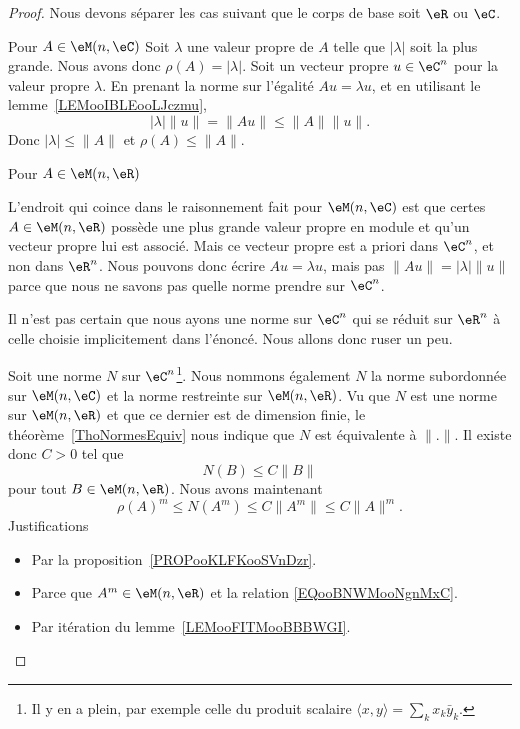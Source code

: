 \begin{proof}
    Nous devons séparer les cas suivant que le corps de base soit \( \eR\) ou \( \eC\).

    \begin{subproof}
        \item[Pour \( A\in \eM(n,\eC)\)]
            Soit \( \lambda\) une valeur propre de \( A\) telle que \( | \lambda |\) soit la plus grande. Nous avons donc \( \rho(A)=| \lambda |\). Soit un vecteur propre \( u\in \eC^n\) pour la valeur propre \( \lambda\). En prenant la norme sur l'égalité \( Au=\lambda u\), et en utilisant le lemme~\ref{LEMooIBLEooLJczmu},
            \begin{equation}
                | \lambda |\| u \|=\| Au \|\leq \| A \|\| u \|.
            \end{equation}
            Donc \( | \lambda |\leq \| A \|\) et \( \rho(A)\leq\| A \|\).

        \item[Pour \( A\in \eM(n,\eR)\)]

            L'endroit qui coince dans le raisonnement fait pour \( \eM(n,\eC)\) est que certes \( A\in \eM(n,\eR)\) possède une plus grande valeur propre en module et qu'un vecteur propre lui est associé. Mais ce vecteur propre est a priori dans \( \eC^n\), et non dans \( \eR^n\). Nous pouvons donc écrire \( Au=\lambda u\), mais pas \( \| Au \|=| \lambda |\| u \|\) parce que nous ne savons pas quelle norme prendre sur \( \eC^n\).

            Il n'est pas certain que nous ayons une norme sur \( \eC^n\) qui se réduit sur \( \eR^n\) à celle choisie implicitement dans l'énoncé. Nous allons donc ruser un peu.

            Soit une norme \( N\) sur \( \eC^n\)\footnote{Il y en a plein, par exemple celle du produit scalaire \( \langle x, y\rangle =\sum_kx_k\bar y_k\).}. Nous nommons également \( N\) la norme subordonnée sur \( \eM(n,\eC)\) et la norme restreinte sur \( \eM(n,\eR)\). Vu que \( N\) est une norme sur \( \eM(n,\eR)\) et que ce dernier est de dimension finie, le théorème~\ref{ThoNormesEquiv} nous indique que \( N\) est équivalente à \( \| . \|\). Il existe donc \( C>0\) tel que
            \begin{equation}        \label{EQooBNWMooNgnMxC}
                 N(B)\leq C\| B \|
            \end{equation}
            pour tout \( B\in \eM(n,\eR)\). Nous avons maintenant
            \begin{equation}
                \rho(A)^m\leq N(A^m)\leq C\| A^m \|\leq C\| A \|^m.
            \end{equation}
            Justifications
            \begin{itemize}
                \item Par la proposition~\ref{PROPooKLFKooSVnDzr}.
                \item Parce que \( A^m\in \eM(n,\eR)\) et la relation \eqref{EQooBNWMooNgnMxC}.
                \item Par itération du lemme~\ref{LEMooFITMooBBBWGI}.
            \end{itemize}


\end{subproof}
\end{proof}
